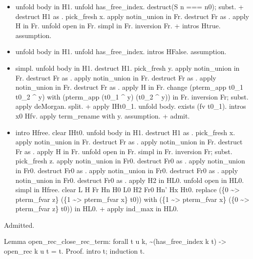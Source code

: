 \begin{itemize}
\item  unfold body in H1.
    unfold has\_free\_index.
    destruct(S n === n0); subst.
    + destruct H1 as .
      pick\_fresh x.
      apply notin\_union in Fr.
      destruct Fr as  .
      apply H in Fr.
      unfold open in Fr.
      simpl in Fr.
      inversion Fr.
    + intros Htrue.
      assumption.

\item  unfold body in H1.
    unfold has\_free\_index.
    intros HFalse.
    assumption.

\item  simpl.
    unfold body in H1.
    destruct H1.
    pick\_fresh y.
     apply notin\_union in Fr.
     destruct Fr as  .
     apply notin\_union in Fr.
     destruct Fr as  .
     apply notin\_union in Fr.
     destruct Fr as  .
     apply H in Fr.
     change (pterm\_app t0\_1 t0\_2 \^{} y) with (pterm\_app (t0\_1 \^{} y) (t0\_2 \^{} y)) in Fr.
     inversion Fr; subst.
     apply deMorgan.
     split.
    + apply IHt0\_1.
      unfold body.
      exists (fv t0\_1).
      intros x0 Hfv.
      apply term\_rename with y.
      assumption.
    + admit.

\item  intro Hfree.
    clear IHt0.
    unfold body in H1.
    destruct H1 as .
    pick\_fresh x.
    apply notin\_union in Fr.
    destruct Fr as  .
    apply notin\_union in Fr.
    destruct Fr as  .
    apply H in Fr.
    unfold open in Fr.
    simpl in Fr.
    inversion Fr; subst.
    pick\_fresh z.
    apply notin\_union in Fr0.
    destruct Fr0 as  .
    apply notin\_union in Fr0.
    destruct Fr0 as  .
    apply notin\_union in Fr0.
    destruct Fr0 as  .
    apply notin\_union in Fr0.
    destruct Fr0 as  .
    apply H2 in HL0.
    unfold open in HL0.
    simpl in Hfree.
    clear L H Fr Hn H0 L0 H2 Fr0 Hn' Hx Ht0.
    replace (\{0 \~{}> pterm\_fvar z\} (\{1 \~{}> pterm\_fvar x\} t0)) with (\{1 \~{}> pterm\_fvar x\} (\{0 \~{}> pterm\_fvar z\} t0)) in HL0.
    + apply ind\_max in HL0.

\end{itemize}
Admitted.


Lemma open\_rec\_close\_rec\_term: forall t u k, \~{}(has\_free\_index k t) -> open\_rec k u t = t.
Proof.
  intro t; induction t.


